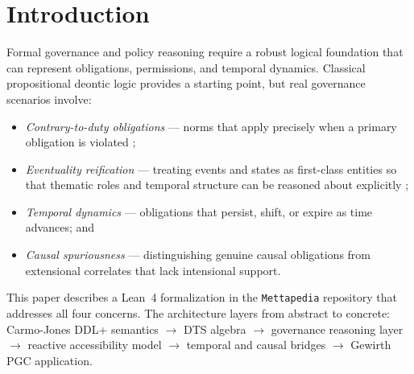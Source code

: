 \documentclass[]{article}
\newcommand{\code}[1]{\texttt{#1}}
\newcommand{\DDL}{\textup{DDL+}}
\newcommand{\DTS}{\textup{DTS}}
\newcommand{\PGC}{\textup{PGC}}
\begin{document}
\tableofcontents
\newpage

\section{Introduction}
\label{sec:intro}

Formal governance and policy reasoning require a robust logical foundation that
can represent obligations, permissions, and temporal dynamics.
Classical propositional deontic logic
\cite{vonWright1951} provides a starting point, but real governance scenarios
involve:
\begin{itemize}
\item \emph{Contrary-to-duty obligations} --- norms that apply precisely when
      a primary obligation is violated \cite{CarmoJones2002};
\item \emph{Eventuality reification} --- treating events and states as
      first-class entities so that thematic roles and temporal structure
      can be reasoned about explicitly \cite{Hobbs1985};
\item \emph{Temporal dynamics} --- obligations that persist, shift, or
      expire as time advances; and
\item \emph{Causal spuriousness} --- distinguishing genuine causal obligations
      from extensional correlates that lack intensional support.
\end{itemize}

This paper describes a Lean~4 formalization in the \code{Mettapedia} repository
that addresses all four concerns.
The architecture layers from abstract to concrete:
Carmo-Jones \DDL{} semantics $\to$ \DTS{} algebra $\to$ governance reasoning layer
$\to$ reactive accessibility model $\to$ temporal and causal bridges $\to$
Gewirth \PGC{} application.
\end{document}
